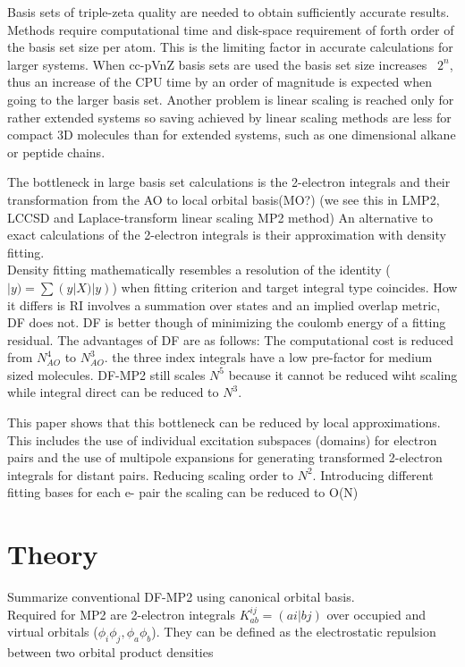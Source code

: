 \documentclass[10pt, draft]{article}
\begin{document}
	 Basis sets of triple-zeta quality are needed to obtain sufficiently accurate results. Methods require computational time and disk-space requirement of forth order of the basis set size per atom.  This is the limiting factor in accurate calculations for larger systems.  When cc-pVnZ basis sets are used the basis set size increases ~$2^n$, thus an increase of the CPU time by an order of magnitude is expected when going to the larger basis set.  Another problem is linear scaling is reached only for rather extended systems so saving achieved by linear scaling methods are less for compact 3D molecules than for extended systems, such as one dimensional alkane or peptide chains.\linebreak[1]
	 
	 The bottleneck in large basis set calculations is the 2-electron integrals and their transformation from the AO to local orbital basis(MO?)  (we see this in LMP2, LCCSD and Laplace-transform linear scaling MP2 method) An alternative to exact calculations of the 2-electron integrals is their approximation with density fitting.  \\
	 Density fitting mathematically resembles a resolution of the identity ($|y)= \sum (y|X)|y)$) when fitting criterion and target integral type coincides.  How it differs is RI involves a summation over states and an implied overlap metric, DF does not. DF is better though of minimizing the coulomb energy of a fitting residual.  The advantages of DF are as follows:  The computational cost is reduced from $N_{AO}^4$ to $N_{AO}^3$. the three index integrals have a low pre-factor for medium sized molecules.  DF-MP2 still scales $N^5$ because it cannot be reduced wiht scaling while integral direct can be reduced to $N^3$.\linebreak[1]
	 
	   This paper shows that this bottleneck can be reduced by local approximations.  This includes the use of individual excitation subspaces (domains) for electron pairs and the use of multipole expansions for generating transformed 2-electron integrals for distant pairs.  Reducing scaling order to $N^2$.  Introducing different fitting bases for each e- pair the scaling can be reduced to O(N)
	   \section{Theory}
	   Summarize conventional DF-MP2 using canonical orbital basis.\\
	   Required for MP2 are 2-electron integrals $K_{ab}^{ij} = (ai|bj)$ over occupied and virtual orbitals ($\phi_i \phi_j , \phi_a \phi_b$).  They can be defined as the electrostatic repulsion between two orbital product densities 
	  
\end{document}
